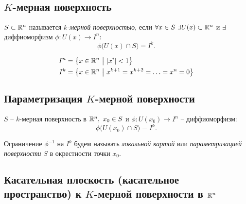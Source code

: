 \subsection{$ K $-мерная поверхность}

\begin{definition}
    $ S \subset \mathbb{R}^n $ называется \emph{$ k $-мерной поверхностью}, если $ \forall x \in S \ \exists U(x)\subset\R^n $ и $ \exists $ диффиоморфизм $ \phi: U(x)\rightarrow I^n $:
    \[
        \phi\big(U(x)\cap S\big) = I^k.
    \]
\end{definition}

\begin{note}
    \begin{align*}
        I^n & = \big\{x \in \mathbb{R}^n \ \big| \ |x^i| < 1 \big\} \\
        I^k & = \big\{x \in \mathbb{R}^n \ \big| \ x^{k+1} = x^{k+2} = \ldots = x^n = 0\big\}
    \end{align*}
\end{note}

\subsection{Параметризация $ K $-мерной поверхности}

\begin{definition}
    $S$ -- $k$-мерная поверхность в $\mathbb{R}^n, \ x_0 \in S$ и $\phi: U(x_0) \rightarrow I^n$ -- диффиоморфизм:
    \[
        \phi\big(U(x_0)\cap S\big) = I^k.
    \]

    Ограничение $\phi^{-1}$ на $I^k$ будем называть \emph{локальной картой} или \emph{параметризацией поверхности} $S$ в окрестности точки $x_0$.
\end{definition}

\subsection{Касательная плоскость (касательное пространство) к $ K $-мерной поверхности в $ \mathbb{R}^n $}

